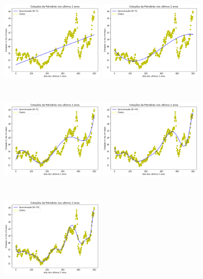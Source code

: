 \documentclass{article}
\begin{document}
\begin{figure}[!htb]
\includegraphics [width=5cm,height=5cm]{LU/G1.png}
\includegraphics [width=5cm,height=5cm]{LU/G3.png}
\includegraphics [width=5cm,height=5cm]{LU/G5.png}
\includegraphics [width=5cm,height=5cm]{LU/G10.png}
\includegraphics [width=5cm,height=5cm]{LU/G15.png}

\end{figure}
\end{document}
